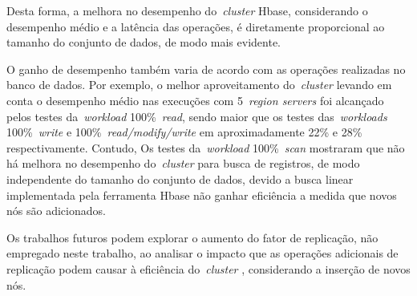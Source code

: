 \documentclass[12pt]{article}
\begin{document}
Desta forma, a melhora no desempenho do~\emph{cluster}  Hbase, considerando o desempenho médio e a latência das operações, é diretamente proporcional ao tamanho do conjunto de dados, de modo mais evidente. 


O ganho de desempenho também varia de acordo com as operações realizadas no banco de dados. Por exemplo, o melhor aproveitamento do~\emph{cluster}  levando em conta o desempenho médio nas execuções com 5~\emph{region servers} foi alcançado pelos testes da~\emph{workload} 100\%~\emph{read}, sendo maior que os testes das~\emph{workloads} 100\%~\emph{write} e 100\%~\emph{read/modify/write} em aproximadamente 22\% e 28\% respectivamente.
Contudo, 
Os testes da~\emph{workload} 100\%~\emph{scan} mostraram que não há melhora no desempenho do~\emph{cluster}  para busca de registros, de modo independente do tamanho do conjunto de dados, devido a busca linear implementada pela ferramenta Hbase não ganhar eficiência a medida que novos nós são adicionados. 

Os trabalhos futuros podem explorar o aumento do fator de replicação, não empregado neste trabalho, ao analisar o impacto que as operações adicionais de replicação
podem causar à eficiência do~\emph{cluster} , considerando a inserção de novos nós.




\end{document}
